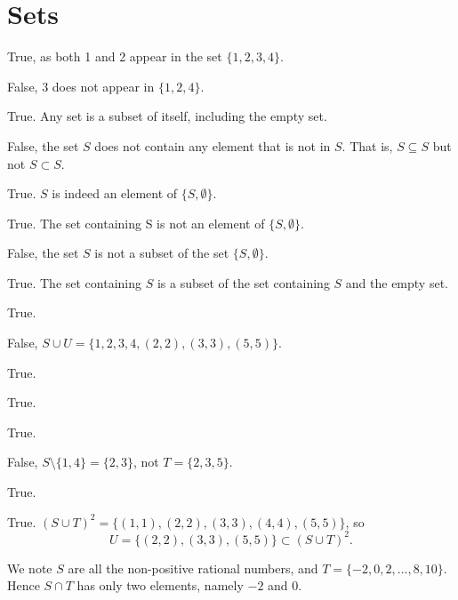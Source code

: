 \section{Sets}
\begin{questions}
    \item \begin{partquestions}{\alph*}
        \item True, as both 1 and 2 appear in the set $\{1, 2, 3, 4\}$.
        \item False, 3 does not appear in $\{1, 2, 4\}$.
        \item True. Any set is a subset of itself, including the empty set.
        \item False, the set $S$ does not contain any element that is not in $S$. That is, $S \subseteq S$ but not $S \subset S$.
        \item True. $S$ is indeed an element of $\{S, \emptyset\}$.
        \item True. The set containing S is not an element of $\{S, \emptyset\}$.
        \item False, the set $S$ is not a subset of the set $\{S, \emptyset\}$.
        \item True. The set containing $S$ is a subset of the set containing $S$ and the empty set.
    \end{partquestions}

    \item \begin{partquestions}{\alph*}
        \item True.
        \item False, $S \cup U = \{1, 2, 3, 4, (2, 2), (3, 3), (5, 5)\}$.
        \item True.
        \item True.
        \item True.
        \item False, $S \setminus \{1, 4\} = \{2, 3\}$, not $T = \{2, 3, 5\}$.
        \item True.
        \item True. $(S \cup T)^2 = \{(1,1), (2,2), (3,3), (4,4), (5,5)\}$, so
        \[
            U = \{(2,2), (3,3), (5,5)\} \subset (S \cup T)^2.
        \]
    \end{partquestions}

    \item We note $S$ are all the non-positive rational numbers, and $T = \{-2, 0, 2, \dots, 8, 10\}$. Hence $S \cap T$ has only two elements, namely $-2$ and $0$.
\end{questions}
